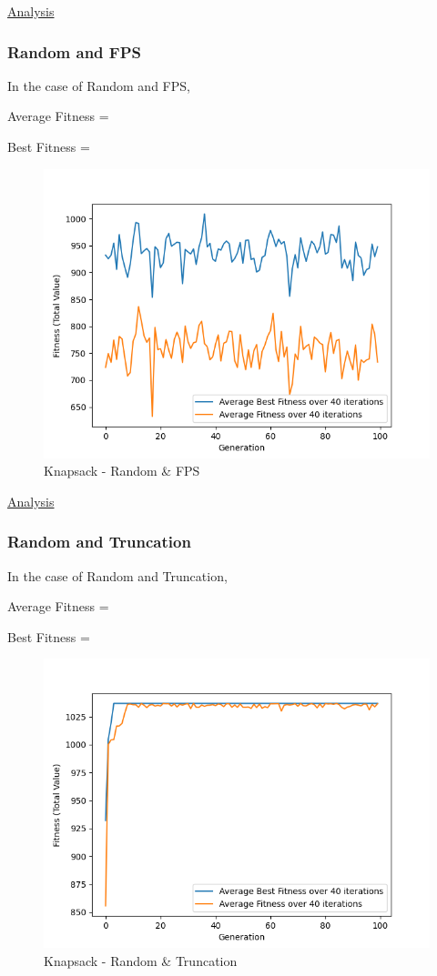 \documentclass[11pt, letterpaper]{article}
\begin{document}
\underline{Analysis}
\subsubsection {Random and FPS}
In the case of Random and FPS,

Average Fitness = 

Best Fitness = 
\begin{figure}[H]
    \centering
    \includegraphics[scale = 0.6]{images/knapsack_rd_fp.png}
    \caption {Knapsack - Random \& FPS}
    \label {fig:kpRB}
\end{figure}

\underline{Analysis}
\subsubsection {Random and Truncation}
In the case of Random and Truncation,

Average Fitness = 

Best Fitness = 
\begin{figure}[H]
    \centering
    \includegraphics[scale = 0.6]{images/knapsack_rd_tr.png}
    \caption {Knapsack - Random \& Truncation}
    \label {fig:kpRT}
\end{figure}
\end{document}
